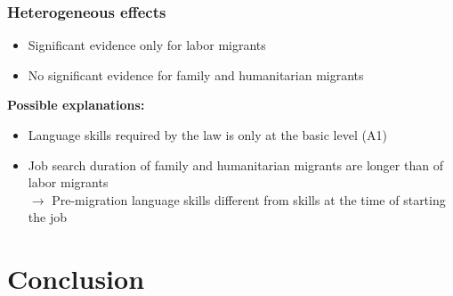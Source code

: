 \documentclass{beamer}
\begin{document}
\begin{frame}
\frametitle{Heterogeneous effects}

\begin{table}[htbp]
  \centering
{}
\end{table}%


\begin{itemize}
\item Significant evidence only for labor migrants
\item No significant evidence for family and humanitarian migrants
\end{itemize}

\textbf{Possible explanations:}
\begin{itemize}
\item Language skills required by the law is only at the basic level (A1)
\item Job search duration of family and humanitarian migrants are longer than of labor migrants \\ $\rightarrow$ Pre-migration language skills different from skills at the time of starting the job
\end{itemize}

\end{frame}

\section{Conclusion}
\end{document}
